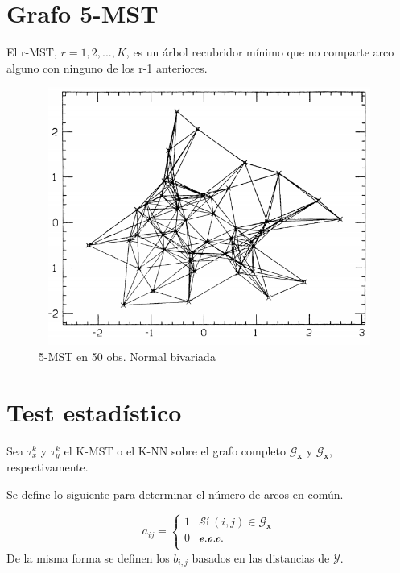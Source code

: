 \documentclass[]{book}
\begin{document}
\section{Grafo 5-MST}\label{grafo-5-mst}

El r-MST, \(r={1, 2,...,K}\), es un árbol recubridor mínimo que no
comparte arco alguno con ninguno de los r-1 anteriores.

\begin{figure}

{\centering \includegraphics[width=450,height=320]{5-MST} 

}

\caption{5-MST en 50 obs. Normal bivariada}\label{fig:unnamed-chunk-6}
\end{figure}

\section{Test estadístico}\label{test-estadistico}

Sea \(\tau_x^k\) y \(\tau_y^k\) el K-MST o el K-NN sobre el grafo
completo \(\mathcal{G}_{\mathbf{x}}\) y \(\mathcal{G}_{\mathbf{x}}\),
respectivamente.

Se define lo siguiente para determinar el número de arcos en común.

\[a_{ij}=  \left\{
  \begin{array}{ll}
 1 &  \mathcal{Sí} \ (i,j)\in \mathcal{G}_{\mathbf{x}}  \\
 0 &  \mathcal{e.o.c.} \\ 
 \end{array}
\right.
\] De la misma forma se definen los \(b_{i,j}\) basados en las
distancias de \(\mathcal{Y}\).
\end{document}
